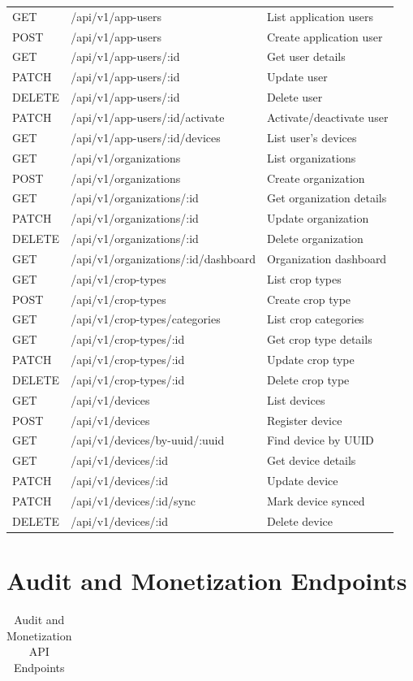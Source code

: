 \documentclass[12pt,a4paper,oneside]{report}
\begin{document}
\begin{appendix}
\begin{longtable}{lll}
\endlastfoot
GET & /api/v1/app-users & List application users \\
POST & /api/v1/app-users & Create application user \\
GET & /api/v1/app-users/:id & Get user details \\
PATCH & /api/v1/app-users/:id & Update user \\
DELETE & /api/v1/app-users/:id & Delete user \\
PATCH & /api/v1/app-users/:id/activate & Activate/deactivate user \\
GET & /api/v1/app-users/:id/devices & List user's devices \\
GET & /api/v1/organizations & List organizations \\
POST & /api/v1/organizations & Create organization \\
GET & /api/v1/organizations/:id & Get organization details \\
PATCH & /api/v1/organizations/:id & Update organization \\
DELETE & /api/v1/organizations/:id & Delete organization \\
GET & /api/v1/organizations/:id/dashboard & Organization dashboard \\
GET & /api/v1/crop-types & List crop types \\
POST & /api/v1/crop-types & Create crop type \\
GET & /api/v1/crop-types/categories & List crop categories \\
GET & /api/v1/crop-types/:id & Get crop type details \\
PATCH & /api/v1/crop-types/:id & Update crop type \\
DELETE & /api/v1/crop-types/:id & Delete crop type \\
GET & /api/v1/devices & List devices \\
POST & /api/v1/devices & Register device \\
GET & /api/v1/devices/by-uuid/:uuid & Find device by UUID \\
GET & /api/v1/devices/:id & Get device details \\
PATCH & /api/v1/devices/:id & Update device \\
PATCH & /api/v1/devices/:id/sync & Mark device synced \\
DELETE & /api/v1/devices/:id & Delete device \\
\end{longtable}

\section{Audit and Monetization Endpoints}
\begin{longtable}{lll}
\caption{Audit and Monetization API Endpoints} \\


\end{longtable}
\end{appendix}
\end{document}
